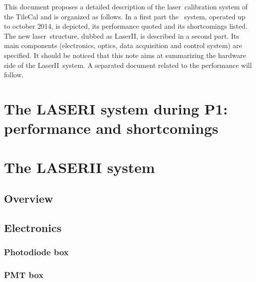 \documentclass[UKenglish,texlive=2013]{\ATLASLATEXPATH atlasdoc}
\newcommand{\laser}{laser}
\newcommand{\lasii}{{\sc LaserII}}
\begin{document}
This document proposes a detailed description of the \laser~calibration system of the TileCal and is organized as follows. In a first part the \laseri~system, operated up to october 2014, is depicted, its performance quoted and its shortcomings listed. The new \laser~structure, dubbed as \lasii, is described in a second part. Its main components (electronics, optics, data acquisition and control system) are specified. It should be noticed that this note aims at summarizing the hardware side of the \lasii~system. A separated document related to the performance will follow. 


\section{The LASERI system during P1: performance and shortcomings}
\label{sec:detector}



\section{The LASERII system}
\label{sec:result}

\subsection{Overview}



\subsection{Electronics}

\subsubsection{Photodiode box}
\label{photodiodebox}



\subsubsection{PMT box}
\label{pmtbox}
\end{document}
